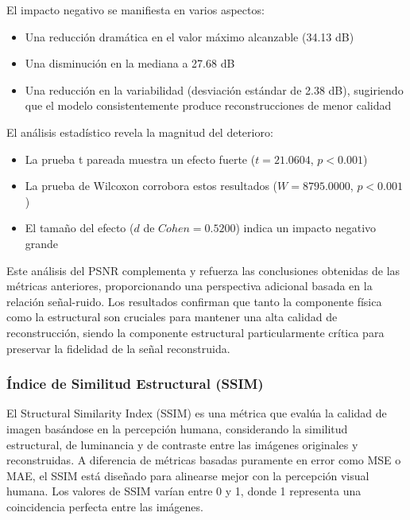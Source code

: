 El impacto negativo se manifiesta en varios aspectos:

\begin{itemize}
    \item Una reducción dramática en el valor máximo alcanzable (34.13 dB)
    \item Una disminución en la mediana a 27.68 dB
    \item Una reducción en la variabilidad (desviación estándar de 2.38 dB), sugiriendo que el modelo consistentemente produce reconstrucciones de menor calidad
\end{itemize}

El análisis estadístico revela la magnitud del deterioro:

\begin{itemize}
    \item La prueba t pareada muestra un efecto fuerte ($t = 21.0604$, $p < 0.001$)
    \item La prueba de Wilcoxon corrobora estos resultados ($W = 8795.0000$, $p < 0.001$)
    \item El tamaño del efecto ($d$ de $Cohen = 0.5200$) indica un impacto negativo grande
\end{itemize}

Este análisis del PSNR complementa y refuerza las conclusiones obtenidas de las métricas anteriores, proporcionando una perspectiva adicional basada en la relación señal-ruido. Los resultados confirman que tanto la componente física como la estructural son cruciales para mantener una alta calidad de reconstrucción, siendo la componente estructural particularmente crítica para preservar la fidelidad de la señal reconstruida.


\subsubsection{Índice de Similitud Estructural (SSIM)}

El Structural Similarity Index (SSIM) es una métrica que evalúa la calidad de imagen basándose en la percepción humana, considerando la similitud estructural, de luminancia y de contraste entre las imágenes originales y reconstruidas. A diferencia de métricas basadas puramente en error como MSE o MAE, el SSIM está diseñado para alinearse mejor con la percepción visual humana. Los valores de SSIM varían entre 0 y 1, donde 1 representa una coincidencia perfecta entre las imágenes.


